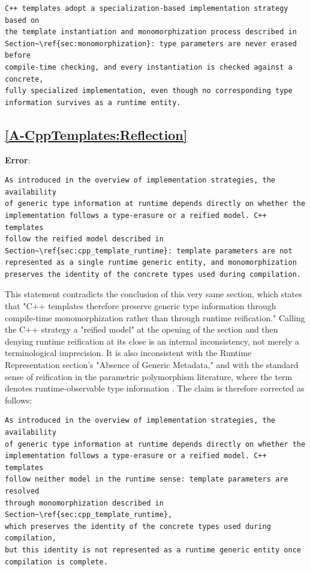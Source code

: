 \documentclass[11pt]{report}
\begin{document}
\begin{Verbatim}[breaklines=true]
C++ templates adopt a specialization-based implementation strategy based on
the template instantiation and monomorphization process described in
Section~\ref{sec:monomorphization}: type parameters are never erased before
compile-time checking, and every instantiation is checked against a concrete,
fully specialized implementation, even though no corresponding type
information survives as a runtime entity.
\end{Verbatim}

\subsection*{\hyperref[A-CppTemplates:Reflection]{\ref*{A-CppTemplates:Reflection} }}
\noindent\textbf{Error}:
\begin{Verbatim}[breaklines=true]
As introduced in the overview of implementation strategies, the availability
of generic type information at runtime depends directly on whether the
implementation follows a type-erasure or a reified model. C++ templates
follow the reified model described in
Section~\ref{sec:cpp_template_runtime}: template parameters are not
represented as a single runtime generic entity, and monomorphization
preserves the identity of the concrete types used during compilation.
\end{Verbatim}
This statement contradicts the conclusion of this very same section, which
states that "C++ templates therefore preserve generic type information
through compile-time monomorphization rather than through runtime
reification." Calling the C++ strategy a "reified model" at the opening of
the section and then denying runtime reification at its close is an internal
inconsistency, not merely a terminological imprecision. It is also
inconsistent with the Runtime Representation section's "Absence of Generic
Metadata," and with the standard sense of reification in the parametric
polymorphism literature, where the term denotes runtime-observable type
information \cite{cardelli1985}. The claim is therefore corrected as
follows:
\begin{Verbatim}[breaklines=true]
As introduced in the overview of implementation strategies, the availability
of generic type information at runtime depends directly on whether the
implementation follows a type-erasure or a reified model. C++ templates
follow neither model in the runtime sense: template parameters are resolved
through monomorphization described in Section~\ref{sec:cpp_template_runtime},
which preserves the identity of the concrete types used during compilation,
but this identity is not represented as a runtime generic entity once
compilation is complete.
\end{Verbatim}
\end{document}
